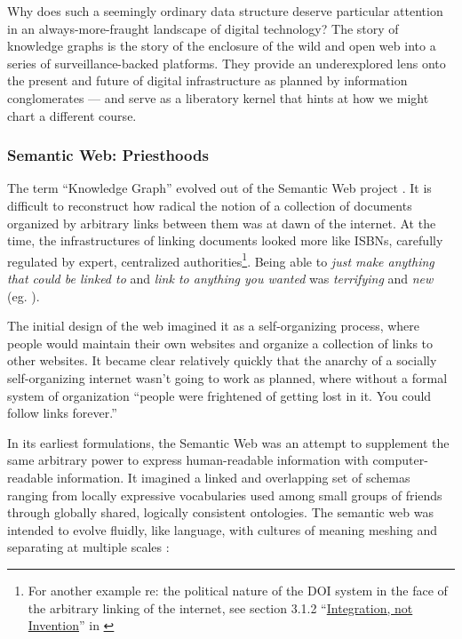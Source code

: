 Why does such a seemingly ordinary data structure deserve particular
attention in an always-more-fraught landscape of digital technology? The
story of knowledge graphs is the story of the enclosure of the wild and
open web into a series of surveillance-backed platforms. They provide an
underexplored lens onto the present and future of digital infrastructure
as planned by information conglomerates --- and serve as a liberatory
kernel that hints at how we might chart a different course.

\hypertarget{semantic-web-priesthoods}{%
\subsubsection{Semantic Web:
Priesthoods}\label{semantic-web-priesthoods}}

The term ``Knowledge Graph'' evolved out of the Semantic Web project
\cite{hitzlerReviewSemanticWeb2021} . It is difficult to
reconstruct how radical the notion of a collection of documents
organized by arbitrary links between them was at dawn of the internet.
At the time, the infrastructures of linking documents looked more like
ISBNs, carefully regulated by expert, centralized
authorities\footnote{For another example re: the political nature of the
  DOI system in the face of the arbitrary linking of the internet, see
  section 3.1.2
  ``\href{https://jon-e.net/infrastructure/\#seemingly-prosocial-protocols-can-be-used-by-industries-to-preem}{Integration,
  not Invention}'' in \cite{saundersDecentralizedInfrastructureNeuro2022} }. Being able to
\emph{just make anything that could be linked to} and \emph{link to
anything you wanted} was \emph{terrifying} and \emph{new} (eg. \cite{berners-leeLinksLaw1997, berners-leeLinksLawMyths1997} ).

The initial design of the web imagined it as a self-organizing process,
where people would maintain their own websites and organize a collection
of links to other websites. It became clear relatively quickly that the
anarchy of a socially self-organizing internet wasn't going to work as
planned, where without a formal system of organization ``people were
frightened of getting lost in it. You could follow links forever.'' \cite{berners-leeWhatSemanticWeb1998} 

In its earliest formulations, the Semantic Web was an attempt to
supplement the same arbitrary power to express human-readable
information with computer-readable information. It imagined a linked and
overlapping set of schemas ranging from locally expressive vocabularies
used among small groups of friends through globally shared, logically
consistent ontologies. The semantic web was intended to evolve fluidly,
like language, with cultures of meaning meshing and separating at
multiple scales \cite{berners-leeScalefreeNatureWeb1998, berners-leeSemanticWeb2001, berners-leeCulturesBoundaries2007} :

